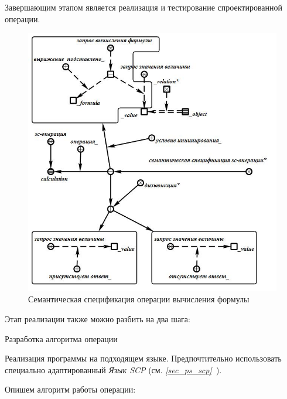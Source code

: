 Завершающим этапом является реализация и тестирование спроектированной операции.

\begin{figure}[H]
	\includegraphics[scale=0.5]{images/part7/chapter_learning_systems/step1.jpg}
	\caption{Семантическая спецификация операции вычисления формулы}
	\label{fig:step1}
\end{figure}

Этап реализации также можно разбить на два шага:

\begin{textitemize}
	\item Разработка алгоритма операции
	\item Реализация программы на подходящем языке. Предпочтительно использовать специально адаптированный \textit{Язык SCP} (см. \textit{\ref{sec_ps_scp}~}).
\end{textitemize}

Опишем алгоритм работы операции:

